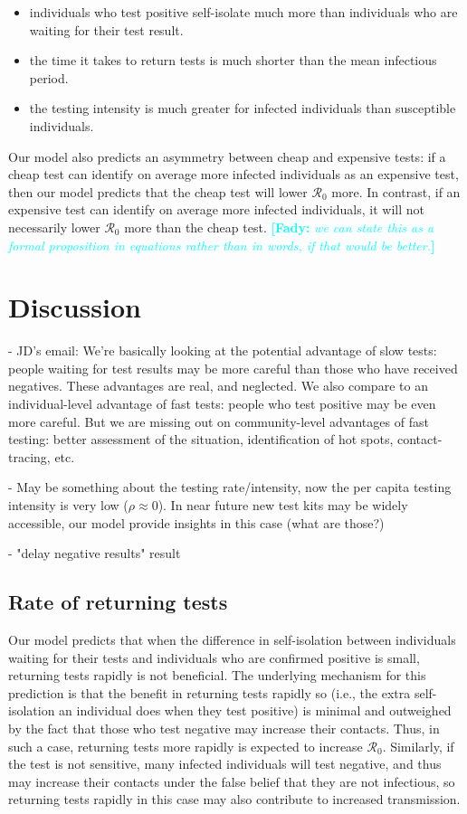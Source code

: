 \documentclass[12pt]{article}
\newcommand{\comment}{\showcomment}
\newcommand{\showcomment}[3]{\textcolor{#1}{\textbf{[#2: }\textsl{#3}\textbf{]}}}
\newcommand{\fady}[1]{\comment{cyan}{Fady}{#1}}
\newcommand{\Rnum}{\mathcal{R}_0}
\theoremstyle{definition} %
\begin{document}
\begin{itemize}
    \item individuals who test positive self-isolate much more than individuals who are waiting for their test result.
    \item the time it takes to return tests is much shorter than the mean infectious period.
    \item the testing intensity is much greater for infected individuals than susceptible individuals.
\end{itemize}

Our model also predicts an asymmetry between cheap and expensive tests: if a cheap test can identify on average more infected individuals as an expensive test, then our model predicts that the cheap test will lower $\Rnum$ more. In contrast, if an expensive test can identify on average more infected individuals, it will not necessarily lower $\Rnum$ more than the cheap test. \fady{we can state this as a formal proposition in equations rather than in words, if that would be better.}


\section{Discussion}

- JD's email:
We're basically looking at the potential advantage of slow tests:
people waiting for test results may be more careful than those who
have received negatives. These advantages are real, and neglected. We
also compare to an individual-level advantage of fast tests: people
who test positive may be even more careful. But we are missing out on
community-level advantages of fast testing: better assessment of the
situation, identification of hot spots, contact-tracing, etc. 

- May be something about the testing rate/intensity, now the per capita testing intensity is very low ($\rho \approx 0$). In near future new test kits may be widely accessible, our model provide insights in this case (what are those?)

- "delay negative results" result

\subsection{Rate of returning tests}

Our model predicts that when the difference in self-isolation between individuals waiting for their tests and individuals who are confirmed positive is small, returning tests rapidly is not beneficial. The underlying mechanism for this prediction is that the benefit in returning tests rapidly so (i.e., the extra self-isolation an individual does when they test positive) is minimal and outweighed by the fact that those who test negative may increase their contacts. Thus, in such a case, returning tests more rapidly is expected to increase $\Rnum$. Similarly, if the test is not sensitive, many infected individuals will test negative, and thus may increase their contacts under the false belief that they are not infectious, so returning tests rapidly in this case may also contribute to increased transmission.
\end{document}
